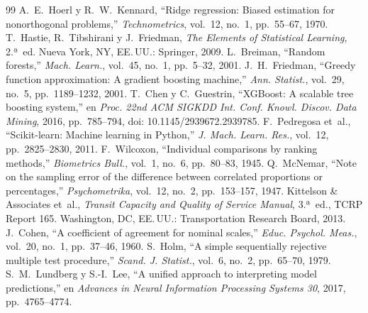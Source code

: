 \documentclass[conference]{IEEEtran}
\begin{document}
\begin{thebibliography}{99}
 A.~E.~Hoerl y R.~W.~Kennard, ``Ridge regression: Biased estimation for nonorthogonal problems,'' \emph{Technometrics}, vol.~12, no.~1, pp.~55--67, 1970.
 T.~Hastie, R.~Tibshirani y J.~Friedman, \emph{The Elements of Statistical Learning}, 2.ª~ed. Nueva York, NY, EE.\,UU.: Springer, 2009.
 L.~Breiman, ``Random forests,'' \emph{Mach. Learn.}, vol.~45, no.~1, pp.~5--32, 2001.
 J.~H.~Friedman, ``Greedy function approximation: A gradient boosting machine,'' \emph{Ann. Statist.}, vol.~29, no.~5, pp.~1189--1232, 2001.
 T.~Chen y C.~Guestrin, ``XGBoost: A scalable tree boosting system,'' en \emph{Proc. 22nd ACM SIGKDD Int. Conf. Knowl. Discov. Data Mining}, 2016, pp.~785--794, doi: 10.1145/2939672.2939785.
 F.~Pedregosa et~al., ``Scikit-learn: Machine learning in Python,'' \emph{J. Mach. Learn. Res.}, vol.~12, pp.~2825--2830, 2011.
 F.~Wilcoxon, ``Individual comparisons by ranking methods,'' \emph{Biometrics Bull.}, vol.~1, no.~6, pp.~80--83, 1945.
 Q.~McNemar, ``Note on the sampling error of the difference between correlated proportions or percentages,'' \emph{Psychometrika}, vol.~12, no.~2, pp.~153--157, 1947.
 Kittelson \& Associates et~al., \emph{Transit Capacity and Quality of Service Manual}, 3.ª~ed., TCRP Report 165. Washington, DC, EE.\,UU.: Transportation Research Board, 2013.
 J.~Cohen, ``A coefficient of agreement for nominal scales,'' \emph{Educ. Psychol. Meas.}, vol.~20, no.~1, pp.~37--46, 1960.
 S.~Holm, ``A simple sequentially rejective multiple test procedure,'' \emph{Scand. J. Statist.}, vol.~6, no.~2, pp.~65--70, 1979.
 S.~M.~Lundberg y S.-I.~Lee, ``A unified approach to interpreting model predictions,'' en \emph{Advances in Neural Information Processing Systems 30}, 2017, pp.~4765--4774.
\end{thebibliography}
\end{document}
